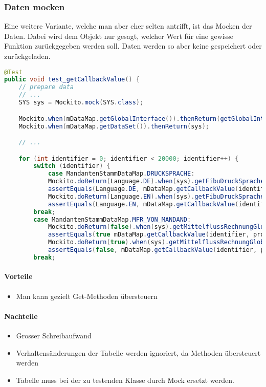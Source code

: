 \subsubsection{Daten mocken}
Eine weitere Variante, welche man aber eher selten antrifft, ist das Mocken der Daten. Dabei wird dem Objekt nur gesagt, welcher Wert für eine gewisse Funktion zurückgegeben werden soll. Daten werden so aber keine gespeichert oder zurückgeladen.
\begin{lstlisting}[language=Java, caption=Beispiel einer gemockten Tabelle]
@Test
public void test_getCallbackValue() {
	// prepare data
	// ...
	SYS sys = Mockito.mock(SYS.class);

	Mockito.when(mDataMap.getGlobalInterface()).thenReturn(getGlobalInterface());
	Mockito.when(mDataMap.getDataSet()).thenReturn(sys);

	// ...

	for (int identifier = 0; identifier < 20000; identifier++) {
		switch (identifier) {
			case MandantenStammDataMap.DRUCKSPRACHE:
			Mockito.doReturn(Language.DE).when(sys).getFibuDruckSprache();
			assertEquals(Language.DE, mDataMap.getCallbackValue(identifier, property));
			Mockito.doReturn(Language.EN).when(sys).getFibuDruckSprache();
			assertEquals(Language.EN, mDataMap.getCallbackValue(identifier, property));
		break;
		case MandantenStammDataMap.MFR_VON_MANDAND:
			Mockito.doReturn(false).when(sys).getMittelflussRechnungGlobal();
			assertEquals(true mDataMap.getCallbackValue(identifier, property));
			Mockito.doReturn(true).when(sys).getMittelflussRechnungGlobal();
			assertEquals(false, mDataMap.getCallbackValue(identifier, property));
		break;
\end{lstlisting}
\paragraph{Vorteile}
\begin{itemize}
\item Man kann gezielt Get-Methoden übersteuern
\end{itemize}
\paragraph{Nachteile}
\begin{itemize}
\item Grosser Schreibaufwand
\item Verhaltensänderungen der Tabelle werden ignoriert, da Methoden übersteuert werden
\item Tabelle muss bei der zu testenden Klasse durch Mock ersetzt werden.
\end{itemize}

